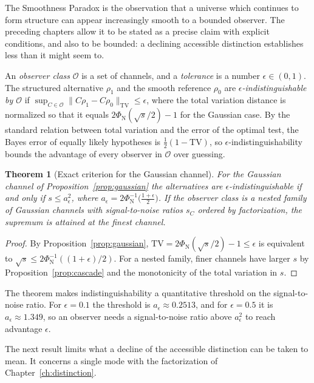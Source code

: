 \documentclass[11pt,oneside]{book}
\newtheorem{theorem}{Theorem}[chapter]
\theoremstyle{definition}
\theoremstyle{remark}
\begin{document}
The Smoothness Paradox is the observation that a universe which continues to form structure can appear increasingly smooth to a bounded observer. The preceding chapters allow it to be stated as a precise claim with explicit conditions, and also to be bounded: a declining accessible distinction establishes less than it might seem to.

An \emph{observer class} $\mathcal O$ is a set of channels, and a \emph{tolerance} is a number $\epsilon\in(0,1)$. The structured alternative $\rho_1$ and the smooth reference $\rho_0$ are \emph{$\epsilon$-indistinguishable by $\mathcal O$} if $\sup_{C\in\mathcal O}\|C\rho_1-C\rho_0\|_{\mathrm{TV}}\leq\epsilon$, where the total variation distance is normalized so that it equals $2\Phi_{\mathrm N}(\sqrt s/2)-1$ for the Gaussian case. By the standard relation between total variation and the error of the optimal test, the Bayes error of equally likely hypotheses is $\tfrac12(1-\mathrm{TV})$, so $\epsilon$-indistinguishability bounds the advantage of every observer in $\mathcal O$ over guessing.

\begin{theorem}[Exact criterion for the Gaussian channel]\label{thm:exact-crit}
For the Gaussian channel of Proposition~\ref{prop:gaussian} the alternatives are $\epsilon$-indistinguishable if and only if $s\leq a_\epsilon^2$, where $a_\epsilon=2\Phi_{\mathrm N}^{-1}\bigl(\tfrac{1+\epsilon}2\bigr)$. If the observer class is a nested family of Gaussian channels with signal-to-noise ratios $s_C$ ordered by factorization, the supremum is attained at the finest channel.
\end{theorem}

\begin{proof}
By Proposition~\ref{prop:gaussian}, $\mathrm{TV}=2\Phi_{\mathrm N}(\sqrt s/2)-1\leq\epsilon$ is equivalent to $\sqrt s\leq2\Phi_{\mathrm N}^{-1}((1+\epsilon)/2)$. For a nested family, finer channels have larger $s$ by Proposition~\ref{prop:cascade} and the monotonicity of the total variation in $s$.
\end{proof}

The theorem makes indistinguishability a quantitative threshold on the signal-to-noise ratio. For $\epsilon=0.1$ the threshold is $a_\epsilon\approx0.2513$, and for $\epsilon=0.5$ it is $a_\epsilon\approx1.349$, so an observer needs a signal-to-noise ratio above $a_\epsilon^2$ to reach advantage $\epsilon$.

The next result limits what a decline of the accessible distinction can be taken to mean. It concerns a single mode with the factorization of Chapter~\ref{ch:distinction}.
\end{document}

